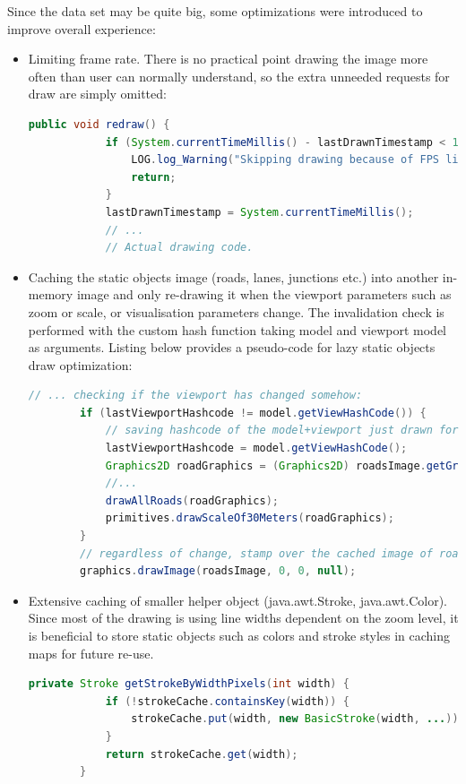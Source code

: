 Since the data set may be quite big, some optimizations were introduced to improve overall experience:
\begin{itemize}
    \item Limiting frame rate. There is no practical point drawing the image more often than user can normally understand, so the extra unneeded requests for draw are simply omitted:
    \begin{lstlisting}[language=java]
        public void redraw() {
            if (System.currentTimeMillis() - lastDrawnTimestamp < 1000 / MAX_FRAME_RATE) {
                LOG.log_Warning("Skipping drawing because of FPS limitation.");
                return;
            }
            lastDrawnTimestamp = System.currentTimeMillis();
            // ...
            // Actual drawing code.
    \end{lstlisting}

    \item Caching the static objects image (roads, lanes, junctions etc.) into another in-memory image and only re-drawing it when the viewport parameters such as zoom or scale, or visualisation parameters change. The invalidation check is performed with the custom hash function taking model and viewport model as arguments. Listing below provides a pseudo-code for lazy static objects draw optimization:
    \begin{lstlisting}[language=java]
        // ... checking if the viewport has changed somehow:
        if (lastViewportHashcode != model.getViewHashCode()) {
            // saving hashcode of the model+viewport just drawn for future check
            lastViewportHashcode = model.getViewHashCode();
            Graphics2D roadGraphics = (Graphics2D) roadsImage.getGraphics();
            //...
            drawAllRoads(roadGraphics);
            primitives.drawScaleOf30Meters(roadGraphics);
        }
        // regardless of change, stamp over the cached image of roads onto resulting image
        graphics.drawImage(roadsImage, 0, 0, null);
    \end{lstlisting}
    \item Extensive caching of smaller helper object (java.awt.Stroke, java.awt.Color). Since most of the drawing is using line widths dependent on the zoom level, it is beneficial to store static objects such as colors and stroke styles in caching maps for future re-use.
    \begin{lstlisting}[language=java]
        private Stroke getStrokeByWidthPixels(int width) {
            if (!strokeCache.containsKey(width)) {
                strokeCache.put(width, new BasicStroke(width, ...));
            }
            return strokeCache.get(width);
        }
    \end{lstlisting}


\end{itemize}


